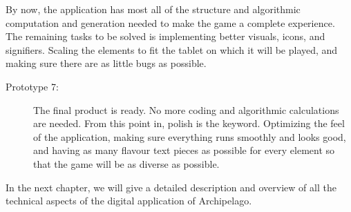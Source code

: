 By now, the application has most all of the structure and algorithmic computation and generation needed to make the game a complete experience.
The remaining tasks to be solved is implementing better visuals, icons, and signifiers. Scaling the elements to fit the tablet on which it will be played, and making sure there are as little bugs as possible.

\begin{description}
\item[Prototype 7:]
The final product is ready. No more coding and algorithmic calculations are needed. From this point in, polish is the keyword. Optimizing the feel of the application, making sure everything runs smoothly and looks good, and having as many flavour text pieces as possible for every element so that the game will be as diverse as possible.
\end{description}

In the next chapter, we will give a detailed description and overview of all the technical aspects of the digital application of Archipelago. 
